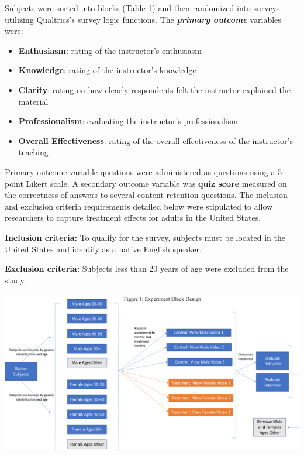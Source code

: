 \documentclass[
]{article}
\providecommand{\tightlist}{%
  \setlength{\itemsep}{0pt}\setlength{\parskip}{0pt}}
\begin{document}
Subjects were sorted into blocks (Table 1) and then randomized into
surveys utilizing Qualtrics's survey logic functions. The
\textbf{\emph{primary outcome}} variables were:

\begin{itemize}
\tightlist
\item
  \textbf{Enthusiasm}: rating of the instructor's enthusiasm
\item
  \textbf{Knowledge}: rating of the instructor's knowledge
\item
  \textbf{Clarity}: rating on how clearly respondents felt the
  instructor explained the material
\item
  \textbf{Professionalism}: evaluating the instructor's professionalism
\item
  \textbf{Overall Effectiveness}: rating of the overall effectiveness of
  the instructor's teaching
\end{itemize}

Primary outcome variable questions were administered as questions using
a 5-point Likert scale. A secondary outcome variable was \textbf{quiz
score} measured on the correctness of answers to several content
retention questions. The inclusion and exclusion criteria requirements
detailed below were stipulated to allow researchers to capture treatment
effects for adults in the United States.

\textbf{Inclusion criteria:} To qualify for the survey, subjects must be
located in the United States and identify as a native English speaker.

\textbf{Exclusion criteria:} Subjects less than 20 years of age were
excluded from the study.

\begin{center}\includegraphics[width=0.9\linewidth,height=0.9\textheight]{images/ExperimentalDesign} \end{center}
\end{document}
